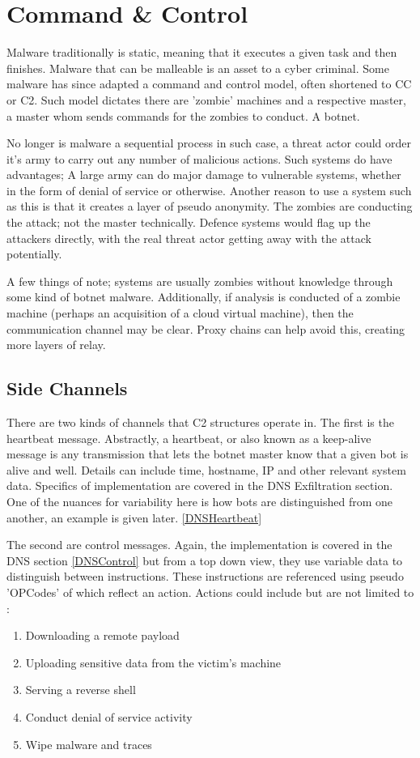 \section{Command \& Control}
Malware traditionally is static, meaning that it executes a given task and then finishes. Malware that can be malleable is an asset to a cyber criminal. 
Some malware has since adapted a command and control model, often shortened to CC or C2. Such model dictates there are 'zombie' machines and a respective master, a master whom sends commands for the zombies to conduct. A botnet.

No longer is malware a sequential process in such case, a threat actor could order it's army to carry out any number of malicious actions. Such systems do have advantages; A large army can do major damage to vulnerable systems, whether in the form of denial of service or otherwise.
Another reason to use a system such as this is that it creates a layer of pseudo anonymity. The zombies are conducting the attack; not the master technically. Defence systems would flag up the attackers directly, with the real threat actor getting away with the attack potentially.

A few things of note; systems are usually zombies without knowledge through some kind of botnet malware. Additionally, if analysis is conducted of a zombie machine (perhaps an acquisition of a cloud virtual machine), then the communication channel may be clear. Proxy chains can help avoid this, creating more layers of relay.

\subsection{Side Channels}\label{C2Channels}
There are two kinds of channels that C2 structures operate in. The first is the heartbeat message. Abstractly, a heartbeat, or also known as a keep-alive message is any transmission that lets the botnet master know that a given bot is alive and well. Details can include time, hostname, IP and other relevant system data. \cite{DNSTunneling}
Specifics of implementation are covered in the DNS Exfiltration section. One of the nuances for variability here is how bots are distinguished from one another, an example is given later. \ref{DNSHeartbeat}

The second are control messages. Again, the implementation is covered in the DNS section \ref{DNSControl} but from a top down view, they use variable data to distinguish between instructions. These instructions are referenced using pseudo 'OPCodes' of which reflect an action. \cite{DNSTunneling}
Actions could include but are not limited to :
\begin{enumerate}
    \item Downloading a remote payload
    \item Uploading sensitive data from the victim's machine
    \item Serving a reverse shell
    \item Conduct denial of service activity
    \item Wipe malware and traces
\end{enumerate}


